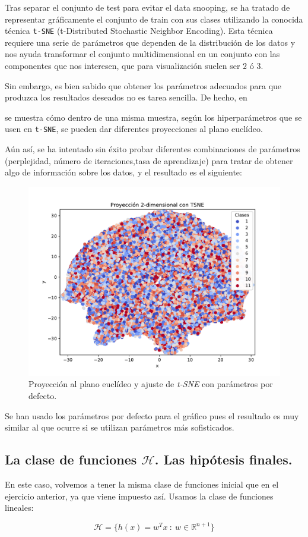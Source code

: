 \documentclass[a4paper, 20pt]{article}
\newcommand{\R}{\mathbb R}
\begin{document}
Tras separar el conjunto de test para evitar el data snooping, se ha tratado de representar gráficamente el conjunto de train con sus clases utilizando la conocida técnica \lstinline{t-SNE} (t-Distributed Stochastic Neighbor Encoding). Esta técnica requiere una serie de parámetros que dependen de la distribución de los datos y nos ayuda transformar el conjunto multidimensional en un conjunto con las componentes que nos interesen, que para visualización suelen ser $2$ ó $3$. 


Sin embargo, es bien sabido que obtener los parámetros adecuados para que produzca los resultados deseados no es tarea sencilla. De hecho, en 


se muestra cómo dentro de una misma muestra, según los hiperparámetros que se usen en \lstinline{t-SNE}, se pueden dar diferentes proyecciones al plano euclídeo. 

Aún así, se ha intentado sin éxito probar diferentes combinaciones de parámetros (perplejidad, número de iteraciones,tasa de aprendizaje) para tratar de obtener algo de información sobre los datos, y el resultado es el siguiente:

\begin{figure}[H]
  \centering
  \includegraphics[width=0.55\linewidth]{media/tsne.pdf}
  \caption{Proyección al plano euclídeo y ajuste de \emph{t-SNE} con parámetros por defecto. }
  \label{fig:tsne}
\end{figure}

Se han usado los parámetros por defecto para el gráfico pues el resultado es muy similar al que ocurre si se utilizan parámetros más sofisticados.




\subsection{La clase de funciones $\mathcal H$. Las hipótesis finales.}

En este caso, volvemos a tener la misma clase de funciones inicial que en el ejercicio anterior, ya que viene impuesto así. Usamos la clase de funciones lineales:

$$
\mathcal H = \{ h(x) = w^T x \ : \ w \in \R^{n+1}\}
$$

\newpage
\printbibliography
\end{document}
